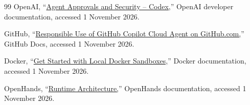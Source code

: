 \documentclass[12pt,a4paper,oneside]{report}
\begin{document}
\begin{thebibliography}{99}
 OpenAI, ``\href{https://developers.openai.com/codex/sandbox}{Agent Approvals and Security -- Codex,}'' OpenAI developer documentation, accessed 1 November 2026.

 GitHub, ``\href{https://docs.github.com/en/copilot/responsible-use-of-github-copilot-features/responsible-use-of-copilot-coding-agent-on-githubcom}{Responsible Use of GitHub Copilot Cloud Agent on GitHub.com,}'' GitHub Docs, accessed 1 November 2026.

 Docker, ``\href{https://docs.docker.com/ai/sandboxes/get-started/}{Get Started with Local Docker Sandboxes,}'' Docker documentation, accessed 1 November 2026.

 OpenHands, ``\href{https://docs.all-hands.dev/modules/usage/architecture/runtime}{Runtime Architecture,}'' OpenHands documentation, accessed 1 November 2026.
\end{thebibliography}
\endgroup
\end{document}
